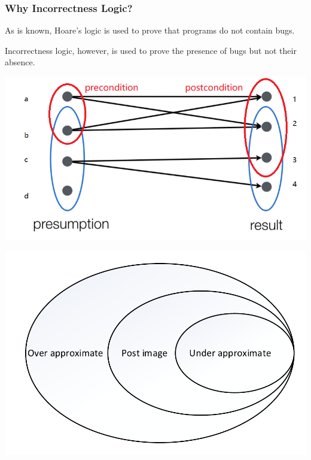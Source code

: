 \documentclass[11pt]{beamer}
\begin{document}
\begin{frame}\frametitle{Why Incorrectness Logic?}
As is known, Hoare's logic is used to prove that programs do not contain bugs.

Incorrectness logic, however, is used  to prove the presence of bugs but not their absence. 

\begin{center}
\includegraphics[scale = 0.30]{1.PNG}

\end{center}
\end{frame}
\begin{frame}
\begin{center}
\includegraphics[scale = 0.6]{1.pdf}

\end{center}

\end{frame}
\end{document}
